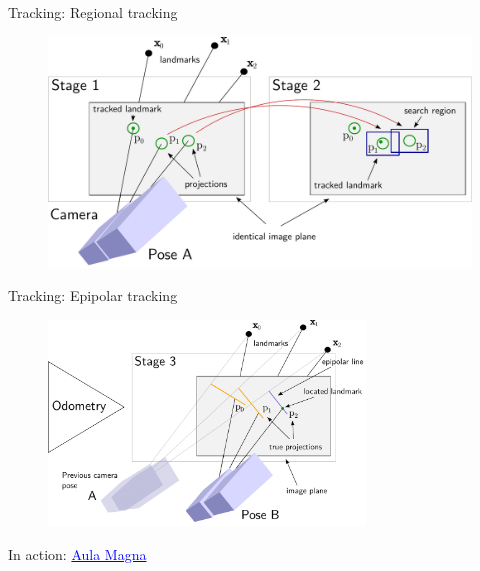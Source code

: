 \documentclass[11pt]{beamer}
\begin{document}
\begin{frame}{Tracking: Regional tracking
}
\begin{figure}[!htb]
\centering
\includegraphics[width=\textwidth]{figures/approach_tracking/concept_regional_tracking.pdf}
\end{figure}
\end{frame}

\begin{frame}{Tracking: Epipolar tracking
}
\begin{figure}[!htb]
\centering
\includegraphics[width=0.75\textwidth]{figures/approach_tracking/concept_epipolar_tracking.pdf}
\end{figure}
In action: \href{run:/home/n551jw/Documents/presentation_ma/aula_magna.ogv}{\textcolor{blue}{Aula Magna}}
\end{frame}
\end{document}
